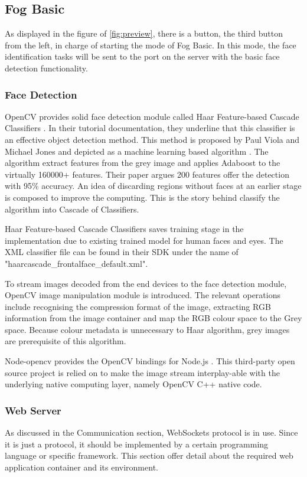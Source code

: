 \subsection{Fog Basic}
As displayed in the figure of \ref{fig:preview}, there is a button, the third button from the left, in charge of starting the mode of Fog Basic. In this mode, the face identification tasks will be sent to the port on the server with the basic face detection functionality. 

\subsubsection{Face Detection}
OpenCV provides solid face detection module called Haar Feature-based Cascade Classifiers \cite{opencv_library}. In their tutorial documentation, they underline that this classifier is an effective object detection method. This method is proposed by Paul Viola and Michael Jones and depicted as a machine learning based algorithm  \cite{viola2001rapid}. The algorithm extract features from the grey image and applies Adaboost to the virtually 160000+ features. Their paper argues 200 features offer the detection with 95\% accuracy. An idea of discarding regions without faces at an earlier stage is composed to improve the computing. This is the story behind classify the algorithm into Cascade of Classifiers.

Haar Feature-based Cascade Classifiers saves training stage in the implementation due to existing trained model for human faces and eyes. The XML classifier file can be found in their SDK under the name of "haarcascade\_frontalface\_default.xml".

To stream images decoded from the end devices to the face detection module, OpenCV image manipulation module is introduced. The relevant operations include recognising the compression format of the image, extracting RGB information from the image container and map the RGB colour space to the Grey space. Because colour metadata is unnecessary to Haar algorithm, grey images are prerequisite of this algorithm.

Node-opencv provides the OpenCV bindings for Node.js  \cite{node-opencv}. This third-party open source project is relied on to make the image stream interplay-able with the underlying native computing layer, namely OpenCV C++ native code.

\subsubsection{Web Server}
As discussed in the Communication section, WebSockets protocol is in use. Since it is just a protocol, it should be implemented by a certain programming language or specific framework. This section offer detail about the required web application container and its environment. 

